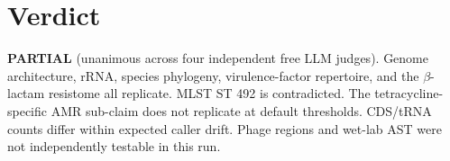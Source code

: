 \documentclass[11pt,letterpaper]{article}
\begin{document}
\section{Verdict}
\textbf{PARTIAL} (unanimous across four independent free LLM judges). Genome architecture, rRNA, species phylogeny, virulence-factor repertoire, and the $\beta$-lactam resistome all replicate. MLST ST 492 is contradicted. The tetracycline-specific AMR sub-claim does not replicate at default thresholds. CDS/tRNA counts differ within expected caller drift. Phage regions and wet-lab AST were not independently testable in this run.
\end{document}
